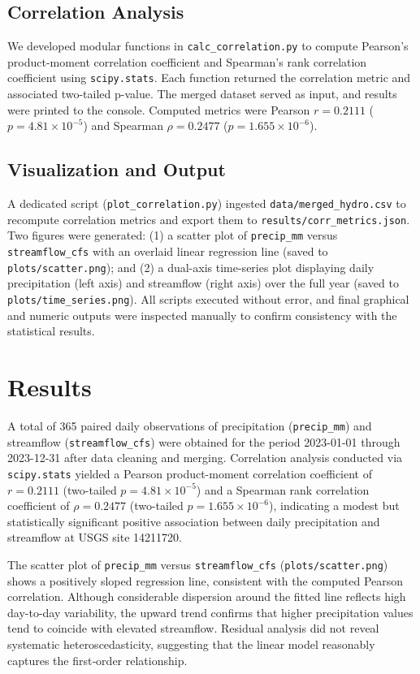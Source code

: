 \documentclass[preprint,12pt]{elsarticle}
\begin{document}
\subsection{Correlation Analysis}
We developed modular functions in \texttt{calc\_correlation.py} to compute Pearson's product-moment correlation coefficient and Spearman's rank correlation coefficient using \texttt{scipy.stats}. Each function returned the correlation metric and associated two-tailed p-value. The merged dataset served as input, and results were printed to the console. Computed metrics were Pearson $r = 0.2111$ ($p = 4.81\times10^{-5}$) and Spearman $\rho = 0.2477$ ($p = 1.655\times10^{-6}$).

\subsection{Visualization and Output}
A dedicated script (\texttt{plot\_correlation.py}) ingested \texttt{data/merged\_hydro.csv} to recompute correlation metrics and export them to \texttt{results/corr\_metrics.json}. Two figures were generated: (1) a scatter plot of \texttt{precip\_mm} versus \texttt{streamflow\_cfs} with an overlaid linear regression line (saved to \texttt{plots/scatter.png}); and (2) a dual-axis time-series plot displaying daily precipitation (left axis) and streamflow (right axis) over the full year (saved to \texttt{plots/time\_series.png}). All scripts executed without error, and final graphical and numeric outputs were inspected manually to confirm consistency with the statistical results.

\section{Results}

A total of 365 paired daily observations of precipitation (\texttt{precip\_mm}) and streamflow (\texttt{streamflow\_cfs}) were obtained for the period 2023-01-01 through 2023-12-31 after data cleaning and merging. Correlation analysis conducted via \texttt{scipy.stats} yielded a Pearson product-moment correlation coefficient of $r = 0.2111$ (two-tailed $p = 4.81\times10^{-5}$) and a Spearman rank correlation coefficient of $\rho = 0.2477$ (two-tailed $p = 1.655\times10^{-6}$), indicating a modest but statistically significant positive association between daily precipitation and streamflow at USGS site 14211720.

The scatter plot of \texttt{precip\_mm} versus \texttt{streamflow\_cfs} (\texttt{plots/scatter.png}) shows a positively sloped regression line, consistent with the computed Pearson correlation. Although considerable dispersion around the fitted line reflects high day-to-day variability, the upward trend confirms that higher precipitation values tend to coincide with elevated streamflow. Residual analysis did not reveal systematic heteroscedasticity, suggesting that the linear model reasonably captures the first‐order relationship.
\end{document}

